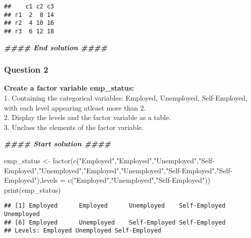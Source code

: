 \documentclass[
]{article}
\newenvironment{Shaded}{\begin{snugshade}}{\end{snugshade}}
\newcommand{\AttributeTok}[1]{\textcolor[rgb]{0.77,0.63,0.00}{#1}}
\newcommand{\DocumentationTok}[1]{\textcolor[rgb]{0.56,0.35,0.01}{\textbf{\textit{#1}}}}
\newcommand{\FunctionTok}[1]{\textcolor[rgb]{0.00,0.00,0.00}{#1}}
\newcommand{\NormalTok}[1]{#1}
\newcommand{\OtherTok}[1]{\textcolor[rgb]{0.56,0.35,0.01}{#1}}
\newcommand{\StringTok}[1]{\textcolor[rgb]{0.31,0.60,0.02}{#1}}
\begin{document}
\begin{verbatim}
##    c1 c2 c3
## r1  2  8 14
## r2  4 10 16
## r3  6 12 18
\end{verbatim}

\begin{Shaded}
\begin{Highlighting}[]
\DocumentationTok{\#\#\#\# End solution \#\#\#\#}
\end{Highlighting}
\end{Shaded}

\hypertarget{question-2}{%
\subsubsection{Question 2}\label{question-2}}

\textbf{Create a factor variable emp\_status:}\\
1. Containing the categorical variables: Employed, Unemployed,
Self-Employed, with each level appearing atleast more than 2.\\
2. Display the levels and the factor variable as a table.\\
3. Unclass the elements of the factor variable.

\begin{Shaded}
\begin{Highlighting}[]
\DocumentationTok{\#\#\#\# Start solution \#\#\#\#}
\end{Highlighting}
\end{Shaded}

\begin{Shaded}
\begin{Highlighting}[]
\NormalTok{emp\_status }\OtherTok{\textless{}{-}} \FunctionTok{factor}\NormalTok{(}\FunctionTok{c}\NormalTok{(}\StringTok{"Employed"}\NormalTok{,}\StringTok{"Employed"}\NormalTok{,}\StringTok{"Unemployed"}\NormalTok{,}\StringTok{"Self{-}Employed"}\NormalTok{,}\StringTok{"Unemployed"}\NormalTok{,}\StringTok{"Employed"}\NormalTok{,}\StringTok{"Unemployed"}\NormalTok{,}\StringTok{"Self{-}Employed"}\NormalTok{,}\StringTok{"Self{-}Employed"}\NormalTok{),}\AttributeTok{levels =} \FunctionTok{c}\NormalTok{(}\StringTok{"Employed"}\NormalTok{,}\StringTok{"Unemployed"}\NormalTok{,}\StringTok{"Self{-}Employed"}\NormalTok{))}
\FunctionTok{print}\NormalTok{(emp\_status)}
\end{Highlighting}
\end{Shaded}

\begin{verbatim}
## [1] Employed      Employed      Unemployed    Self-Employed Unemployed   
## [6] Employed      Unemployed    Self-Employed Self-Employed
## Levels: Employed Unemployed Self-Employed
\end{verbatim}
\end{document}

